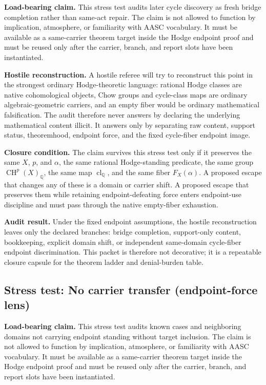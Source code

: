 \documentclass[11pt]{article}
\newcommand{\QQ}{\mathbb{Q}}
\newcommand{\CH}{\operatorname{CH}}
\newcommand{\clQ}{\operatorname{cl}_{\QQ}}
\begin{document}
\par\noindent\textbf{Load-bearing claim.} This stress test audits later cycle discovery as fresh bridge completion rather than same-act repair. The claim is not allowed to function by implication, atmosphere, or familiarity with AASC vocabulary. It must be available as a same-carrier theorem target inside the Hodge endpoint proof and must be reused only after the carrier, branch, and report slots have been instantiated.

\par\noindent\textbf{Hostile reconstruction.} A hostile referee will try to reconstruct this point in the strongest ordinary Hodge-theoretic language: rational Hodge classes are native cohomological objects, Chow groups and cycle-class maps are ordinary algebraic-geometric carriers, and an empty fiber would be ordinary mathematical falsification. The audit therefore never answers by declaring the underlying mathematical content illicit. It answers only by separating raw content, support status, theoremhood, endpoint force, and the fixed cycle-fiber endpoint image.

\par\noindent\textbf{Closure condition.} The claim survives this stress test only if it preserves the same $X$, $p$, and $\alpha$, the same rational Hodge-standing predicate, the same group $\CH^p(X)_\QQ$, the same map $\clQ$, and the same fiber $F_X(\alpha)$. A proposed escape that changes any of these is a domain or carrier shift. A proposed escape that preserves them while retaining endpoint-defeating force enters endpoint-use discipline and must pass through the native empty-fiber exhaustion.

\par\noindent\textbf{Audit result.} Under the fixed endpoint assumptions, the hostile reconstruction leaves only the declared branches: bridge completion, support-only content, bookkeeping, explicit domain shift, or independent same-domain cycle-fiber endpoint discrimination. This packet is therefore not decorative; it is a repeatable closure capsule for the theorem ladder and denial-burden table.


\subsection{Stress test: No carrier transfer (endpoint-force lens)}

\par\noindent\textbf{Load-bearing claim.} This stress test audits known cases and neighboring domains not carrying endpoint standing without target inclusion. The claim is not allowed to function by implication, atmosphere, or familiarity with AASC vocabulary. It must be available as a same-carrier theorem target inside the Hodge endpoint proof and must be reused only after the carrier, branch, and report slots have been instantiated.
\end{document}
